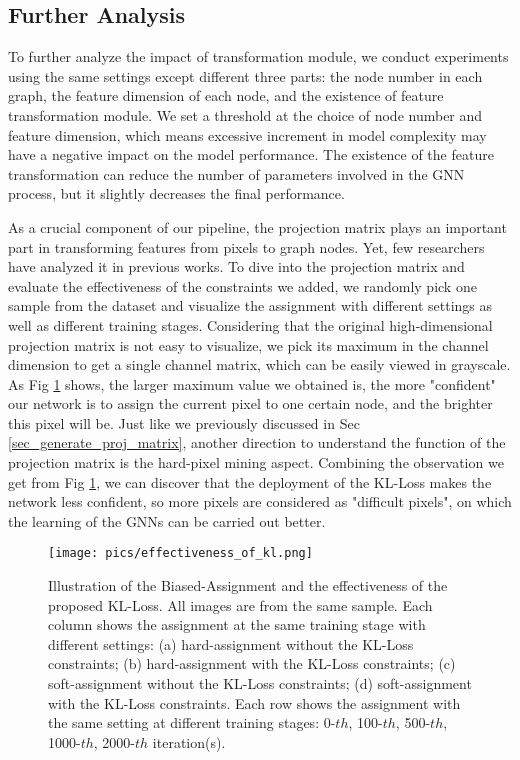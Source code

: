 ﻿\documentclass[journal]{IEEEtran}
\begin{document}
    \subsection{Further Analysis}\label{sec_sub_further}
    To further analyze the impact of transformation module, we conduct experiments using the same settings except different three parts: the node number in each graph, the feature dimension of each node, and the existence of feature transformation module. We set a threshold at the choice of node number and feature dimension, which means excessive increment in model complexity may have a negative impact on the model performance. The existence of the feature transformation can reduce the number of parameters involved in the GNN process, but it slightly decreases the final performance. 

    As a crucial component of our pipeline, the projection matrix plays an important part in transforming features from pixels to graph nodes. Yet, few researchers have analyzed it in previous works. To dive into the projection matrix and evaluate the effectiveness of the constraints we added, we randomly pick one sample from the dataset and visualize the assignment with different settings as well as different training stages. Considering that the original high-dimensional projection matrix is not easy to visualize, we pick its maximum in the channel dimension to get a single channel matrix, which can be easily viewed in grayscale. As Fig \ref{fig_biased_assignment} shows, the larger maximum value we obtained is, the more "confident" our network is to assign the current pixel to one certain node, and the brighter this pixel will be. Just like we previously discussed in Sec \ref{sec_generate_proj_matrix}, another direction to understand the function of the projection matrix is the hard-pixel mining aspect. Combining the observation we get from Fig \ref{fig_biased_assignment}, we can discover that the deployment of the KL-Loss makes the network less confident, so more pixels are considered as "difficult pixels", on which the learning of the GNNs can be carried out better.



\begin{figure}
    \centering
    \texttt{[image: pics/effectiveness\_of\_kl.png]}
    \caption{Illustration of the Biased-Assignment and the effectiveness of the proposed KL-Loss. All images are from the same sample. Each column shows the assignment at the same training stage with different settings: (a) hard-assignment without the KL-Loss constraints; (b) hard-assignment with the KL-Loss constraints; (c) soft-assignment without the KL-Loss constraints; (d) soft-assignment with the KL-Loss constraints. Each row shows the assignment with the same setting at different training stages: 0-$th$, 100-$th$, 500-$th$, 1000-$th$, 2000-$th$ iteration(s).  }
    \label{fig_biased_assignment}
\end{figure} 
\end{document}
